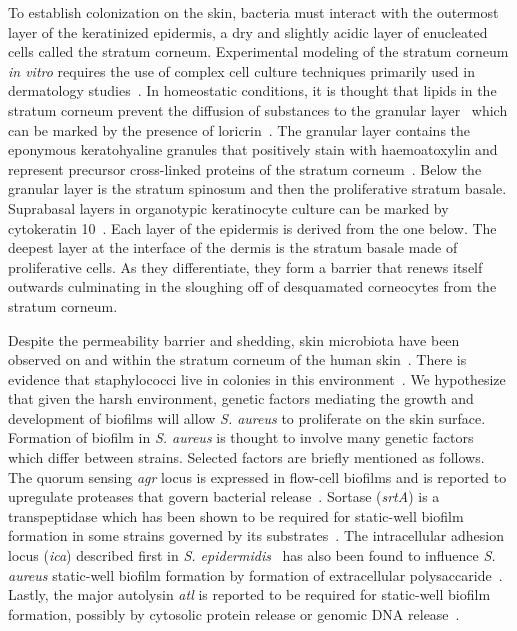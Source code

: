 \documentclass[10pt,letterpaper]{article}
\begin{document}
To establish colonization on the skin, bacteria must interact with the outermost layer of the keratinized epidermis, a dry and slightly acidic layer of enucleated cells called the stratum corneum.
Experimental modeling of the stratum corneum \textit{in vitro} requires the use of complex cell culture techniques primarily used in dermatology studies~\cite{nolte_development_1993}.
In homeostatic conditions, it is thought that lipids in the stratum corneum prevent the diffusion of substances to the granular layer~\cite{elias_epidermal_1983} which can be marked by the presence of loricrin~\cite{hohl_expression_1993}.
The granular layer contains the eponymous keratohyaline granules that positively stain with haemoatoxylin and represent precursor cross-linked proteins of the stratum corneum~\cite{matoltsy_desmosomes_1975}.
Below the granular layer is the stratum spinosum and then the proliferative stratum basale.
Suprabasal layers in organotypic keratinocyte culture can be marked by cytokeratin 10~\cite{stark_organotypic_1999}.
Each layer of the epidermis is derived from the one below.
The deepest layer at the interface of the dermis is the stratum basale made of proliferative cells.
As they differentiate, they form a barrier that renews itself outwards culminating in the sloughing off of desquamated corneocytes from the stratum corneum.

Despite the permeability barrier and shedding, skin microbiota have been observed on and within the stratum corneum of the human skin~\cite{malcolm_demonstration_1980}.
There is evidence that staphylococci live in colonies in this environment~\cite{ten_broeke-smits_hair_2010, nakatsuji_microbiome_2013}.
We hypothesize that given the harsh environment, genetic factors mediating the growth and development of biofilms will allow \textit{S. aureus} to proliferate on the skin surface.
Formation of biofilm in \textit{S. aureus} is thought to involve many genetic factors which differ between strains.
Selected factors are briefly mentioned as follows.
The quorum sensing \textit{agr} locus is expressed in flow-cell biofilms and is reported to upregulate proteases that govern bacterial release~\cite{periasamy_how_2012, boles_agr-mediated_2008, yarwood_quorum_2004}.
Sortase (\textit{srtA}) is a transpeptidase which has been shown to be required for static-well biofilm formation in some strains governed by its substrates~\cite{oneill_novel_2008}.
The intracellular adhesion locus (\textit{ica}) described first in \textit{S. epidermidis}~\cite{mack_intercellular_1996} has also been found to influence \textit{S. aureus} static-well biofilm formation by formation of extracellular polysaccaride~\cite{cramton_intercellular_1999}.
Lastly, the major autolysin \textit{atl} is reported to be required for static-well biofilm formation, possibly by cytosolic protein release or genomic DNA release~\cite{bose_contribution_2012,foulston_extracellular_2014,ranjit_staphylococcus_2011}.
\end{document}
